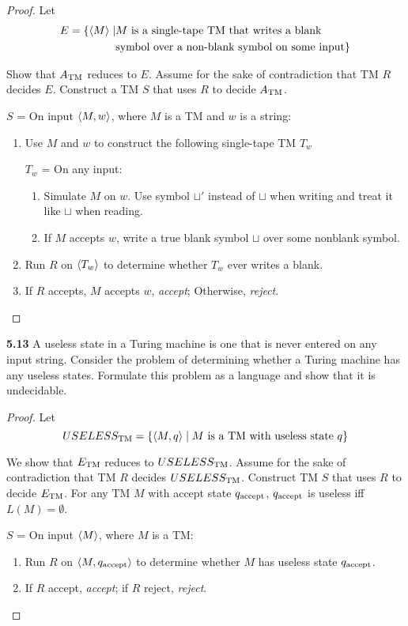 \begin{mdframed}
\begin{proof}
Let 
\begin{align*}
E = \{ \langle{M}\rangle \mid &\text{$M$ is a single-tape TM that writes a blank} \\
& \text{symbol over a non-blank symbol on some input}\}
\end{align*}

Show that $A_{\text{TM}}$ reduces to $E$. Assume for the sake of contradiction that TM $R$ decides $E$. Construct a TM $S$ that uses $R$ to decide $A_{\text{TM}}$.

\medskip
$S$ = On input $\langle{M, w}\rangle$, where $M$ is a TM and $w$ is a string:
\begin{enumerate}
\item Use $M$ and $w$ to construct the following single-tape TM $T_w$

$T_w$ = On any input:
\begin{enumerate}
\item Simulate $M$ on $w$. Use symbol $\sqcup'$ instead of $\sqcup$ when writing and treat it like $\sqcup$ when reading.
\item If $M$ accepts $w$, write a true blank symbol $\sqcup$ over some nonblank symbol.
\end{enumerate}

\item Run $R$ on $\langle{T_w}\rangle$ to determine whether $T_w$ ever writes a blank.
\item If $R$ accepts, $M$ accepts $w$, \textit{accept}; Otherwise, \textit{reject}.
\end{enumerate}
\end{proof}
\end{mdframed}

\label{lang:USELESSTM_UDCDB}
\textbf{5.13} A useless state in a Turing machine is one that is never entered on any input string. Consider the problem of determining whether a Turing machine has any useless states. Formulate this problem as a language and show that it is undecidable.

\begin{mdframed}
\begin{proof}
Let 
\[
USELESS_{\text{TM}} = \{ \langle{M, q}\rangle \mid \text{$M$ is a TM with useless state $q$} \}
\]

We show that $E_{\text{TM}}$ reduces to $USELESS_{\text{TM}}$. Assume for the sake of contradiction that TM $R$ decides $USELESS_{\text{TM}}$. Construct TM $S$ that uses $R$ to decide $E_{\text{TM}}$. For any TM $M$ with accept state $q_{\text{accept}}$, $q_{\text{accept}}$ is useless iff $L(M) = \emptyset$.

\medskip
$S$ = On input $\langle{M}\rangle$, where $M$ is a TM:
\begin{enumerate}
\item Run $R$ on $\langle{M, q_{\text{accept}}}\rangle$ to determine whether $M$ has useless state $q_{\text{accept}}$.
\item If $R$ accept, \textit{accept}; if $R$ reject, \textit{reject}.
\end{enumerate}
\end{proof}
\end{mdframed}

